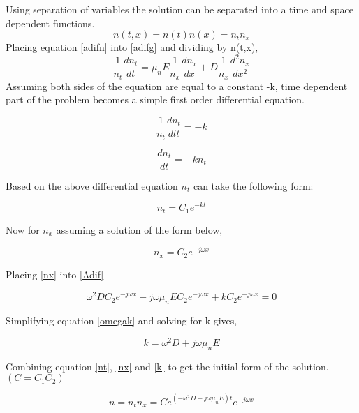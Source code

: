 \begin{doublespace}
Using separation of variables the solution can be separated into a time and space dependent functions.
\begin{equation}
n(t,x)=n(t)n(x)=n_t n_x
\label{adifn}
\end{equation}
Placing equation \eqref{adifn} into \eqref{adifg} and dividing by n(t,x),
\begin{equation}
\frac{1}{n_{t}}\frac{d n_{t}}{d t}=\mu_n E \frac{1}{n_{x}}\frac{d n_{x}}{dx}+D\frac{1}{n_{x}}\frac{d^2 n_{x}}{dx^2}
\label{Adif}
\end{equation}
Assuming both sides of the equation are equal to a constant -k, time dependent part of the problem becomes a simple first order differential equation.

\begin{equation}
\nonumber
\frac{1}{n_{t}}\frac{d n_{t}}{dl t}=-k
\end{equation}

\begin{equation}
\nonumber
\frac{d n_{t}}{d t}=-kn_t
\end{equation}

Based on the above differential equation $n_t$ can take the following form:

\begin{equation}
n_t=C_1 e^{-kt}
\label{nt}
\end{equation}

Now for $n_x$ assuming a solution of the form below,

\begin{equation}
n_x=C_2 e^{-j\omega x}
\label{nx}
\end{equation}

Placing \eqref{nx} into \eqref{Adif}

\begin{equation}
\omega^2 D C_2 e^{-j\omega x}-j\omega \mu_n E C_2 e^{-j\omega x}+kC_2e^{-j\omega x}=0
\label{omegak}
\end{equation}

Simplifying equation \eqref{omegak} and solving for k gives,

\begin{equation}
k=\omega^2 D+j\omega \mu_n E
\label{k}
\end{equation}

Combining equation \eqref{nt}, \eqref{nx} and \eqref{k} to get the initial form of the solution. $(C=C_1C_2)$

\begin{equation}
n=n_tn_x=Ce^{(-\omega^2 D + j\omega \mu_n E)t} e^{-j\omega x}
\end{equation}


\end{doublespace}
